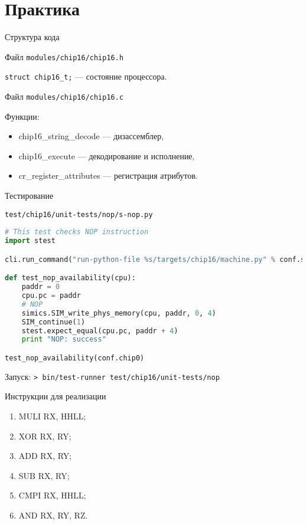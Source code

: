 \ifilab
\section{Практика}

\begin{frame}{Структура кода}

Файл \texttt{modules/chip16/chip16.h}

\texttt{struct chip16\_t;} --- состояние процессора.

\pause\bigskip

Файл \texttt{modules/chip16/chip16.c}

Функции:

\begin{itemize}
    \item chip16\_string\_decode --- дизассемблер,
    \item chip16\_execute --- декодирование и исполнение,
    \item cr\_register\_attributes --- регистрация атрибутов.
\end{itemize}

\end{frame}

\begin{frame}[fragile]{Тестирование}

\texttt{test/chip16/unit-tests/nop/s-nop.py}

\begin{lstlisting}[language=python, basicstyle=\scriptsize]
# This test checks NOP instruction
import stest

cli.run_command("run-python-file %s/targets/chip16/machine.py" % conf.sim.workspace)

def test_nop_availability(cpu):
    paddr = 0
    cpu.pc = paddr
    # NOP
    simics.SIM_write_phys_memory(cpu, paddr, 0, 4)
    SIM_continue(1)
    stest.expect_equal(cpu.pc, paddr + 4)
    print "NOP: success"

test_nop_availability(conf.chip0)
\end{lstlisting}

Запуск: \texttt{> bin/test-runner test/chip16/unit-tests/nop}
\end{frame}

\begin{frame}{Инструкции для реализации}
\begin{enumerate}
    \item MULI RX, HHLL;
    \item XOR RX, RY;
    \item ADD RX, RY;
    \item SUB RX, RY;
    \item CMPI RX, HHLL;
    \item AND RX, RY, RZ.
\end{enumerate}
\end{frame}
\fi

